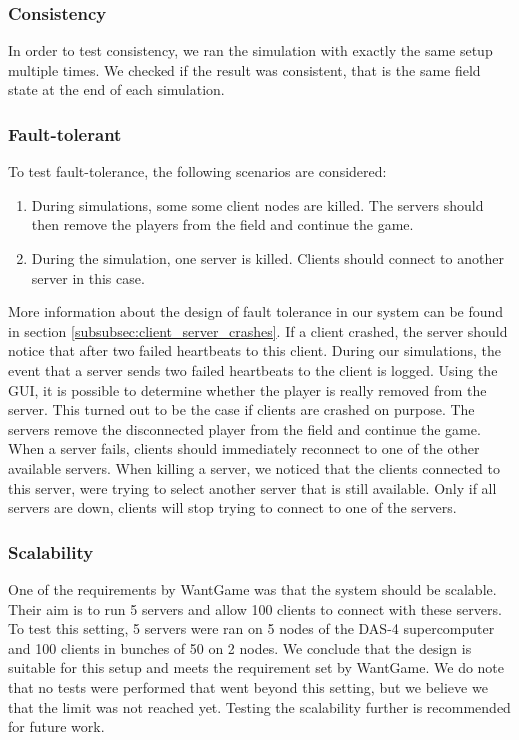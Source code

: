 	\subsubsection{Consistency}
	\label{subsubsec:consistency}
		In order to test consistency, we ran the simulation with exactly the same setup multiple times.
		We checked if the result was consistent, that is the same field state at the end of each simulation. 
		
	\subsubsection{Fault-tolerant}
	\label{subsubsec:fault-tolerant}
		To test fault-tolerance, the following scenarios are considered:
		\begin{enumerate}
			\item During simulations, some some client nodes are killed. The servers should then remove the players from the field and continue the game.
			\item During the simulation, one server is killed. Clients should connect to another server in this case.
		\end{enumerate}
		
		More information about the design of fault tolerance in our system can be found in section \ref{subsubsec:client_server_crashes}. If a client crashed, the server should notice that after two failed heartbeats to this client. During our simulations, the event that a server sends two failed heartbeats to the client is logged. Using the GUI, it is possible to determine whether the player is really removed from the server. This turned out to be the case if clients are crashed on purpose. The servers remove the disconnected player from the field and continue the game.\\
		When a server fails, clients should immediately reconnect to one of the other available servers. When killing a server, we noticed that the clients connected to this server, were trying to select another server that is still available. Only if all servers are down, clients will stop trying to connect to one of the servers.
		
	\subsubsection{Scalability}
	\label{subsubsec:scalability} 
		One of the requirements by WantGame was that the system should be scalable. Their aim is to run 5 servers and allow 100 clients to connect with these servers.
		To test this setting, 5 servers were ran on 5 nodes of the DAS-4 supercomputer and 100 clients in bunches of 50 on 2 nodes. We conclude that the design is suitable for this setup and meets the requirement set by WantGame.
		We do note that no tests were performed that went beyond this setting, but we believe we that the limit was not reached yet. Testing the scalability further is recommended for future work.
		
